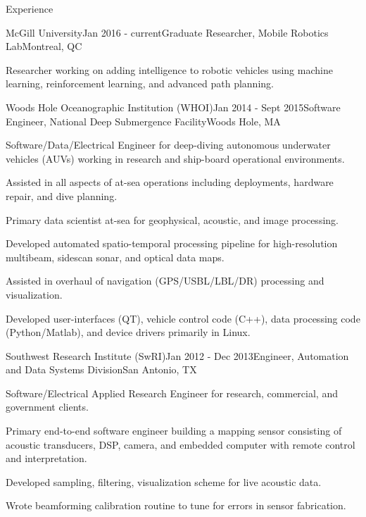 \documentclass{resume} %
\begin{document}
\begin{rSection}{Experience}

\begin{rSubsection}{McGill University}{Jan 2016 - current}{Graduate Researcher, Mobile Robotics Lab}{Montreal, QC}
\item{Researcher working on adding intelligence to robotic vehicles using machine learning, 
    reinforcement learning, and advanced path planning. } 
\end{rSubsection}
\begin{rSubsection}{Woods Hole Oceanographic Institution (WHOI)}{Jan 2014 - Sept 2015}{Software Engineer, National Deep Submergence Facility}{Woods Hole, MA}
\item{Software/Data/Electrical Engineer for deep-diving autonomous underwater vehicles (AUVs) working in research and ship-board operational environments.}
\item{Assisted in all aspects of at-sea operations including deployments, hardware repair, and dive planning.}
\item{Primary data scientist at-sea for geophysical, acoustic, and image processing.}
\item{Developed automated spatio-temporal processing pipeline for high-resolution multibeam, sidescan sonar, and optical data maps.}
\item{Assisted in overhaul of navigation (GPS/USBL/LBL/DR) processing and visualization.}
\item{Developed user-interfaces (QT), vehicle control code (C++), data processing code (Python/Matlab), and device drivers primarily in Linux.}
\end{rSubsection}
%
\begin{rSubsection}{Southwest Research Institute (SwRI)}{Jan 2012 - Dec 2013}{Engineer, Automation and Data Systems Division}{San Antonio, TX}{}
\item{Software/Electrical Applied Research Engineer for research, commercial, and government clients.}
\item{Primary end-to-end software engineer building a mapping sensor consisting of acoustic transducers, DSP, camera, and embedded computer with remote control and interpretation.}
\item{Developed sampling, filtering, visualization scheme for live acoustic data.}
\item{Wrote beamforming calibration routine to tune for errors in sensor fabrication.}
\end{rSubsection}


\end{rSection}
\end{document}
